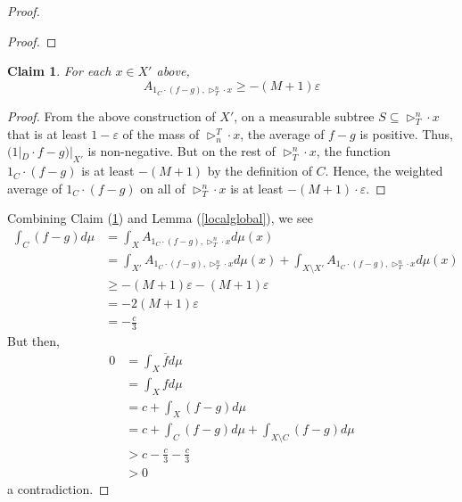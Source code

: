 \documentclass{article}
\let\oldref\ref
\renewcommand{\ref}[1]{(\oldref{#1})}
\newtheorem{claim}[theorem]{Claim}
\theoremstyle{definition}
\begin{document}
\begin{proof}
\begin{proof}
    \end{proof}
    \begin{claim}\label{touse}
        For each $ x\in X' $ above,
        \[
        A_{1_C\cdot (f-g),\triangleright_T^n\cdot x} \geq -(M+1)\varepsilon
        \]
    \end{claim}
    \begin{proof}
        From the above construction of $ X' $, on a measurable subtree $ S\subseteq \triangleright^n_T \cdot x $ that is at least $ 1-\varepsilon $ of the mass of $ \triangleright_n^T\cdot x $, the average of $ f-g $ is positive. Thus, $ (1|_D\cdot f-g)|_{X'} $ is non-negative. But on the rest of $ \triangleright_T^n\cdot x $, the function $ 1_C\cdot (f-g) $ is at least $ -(M+1) $ by the definition of $ C $. Hence, the weighted average of $ 1_C\cdot (f-g) $ on all of $ \triangleright_T^n\cdot x $ is at least $ -(M+1)\cdot \varepsilon $.
    \end{proof}
    \noindent Combining Claim \ref{touse} and Lemma \ref{localglobal}, we see
    \begin{align*}
        \int_C (f-g)d\mu &= \int_X A_{1_C\cdot (f-g),\triangleright_T^n\cdot x} d\mu(x)\\
        &= \int_{X'} A_{1_C\cdot (f-g),\triangleright_T^n\cdot x} d\mu(x) + \int_{X\setminus X'} A_{1_C\cdot (f-g),\triangleright_T^n\cdot x} d\mu(x)\\
        &\geq -(M+1)\varepsilon - (M+1)\varepsilon \\
        &= -2(M+1)\varepsilon \\
        &= -\frac{c}{3} 
    \end{align*}
    But then,
    \begin{align*}
        0 &= \int_X \overline{f} d\mu \\
        &= \int_X fd\mu\\
        &= c + \int_X (f-g)d\mu\\
        &= c + \int_C (f-g)d\mu + \int_{X\setminus C} (f-g)d\mu\\
        &> c-\frac{c}{3}-\frac{c}{3}\\
        &> 0
    \end{align*}
    a contradiction.
\end{proof}
\end{document}
